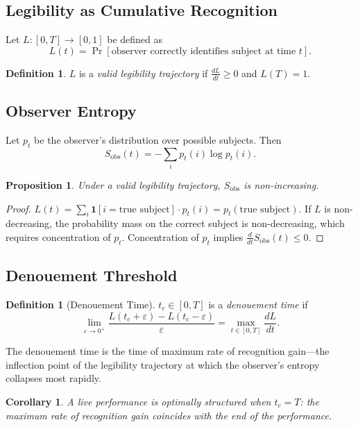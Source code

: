 \documentclass[11pt, twoside]{article}
\theoremstyle{plain}
\newtheorem{proposition}[theorem]{Proposition}
\newtheorem{corollary}[theorem]{Corollary}
\theoremstyle{definition}
\newtheorem{definition}[theorem]{Definition}
\theoremstyle{remark}
\begin{document}
\subsection{Legibility as Cumulative Recognition}

Let $L : [0, T] \to [0, 1]$ be defined as
\[
L(t) = \Pr[\text{observer correctly identifies subject at time } t].
\]

\begin{definition}
$L$ is a \emph{valid legibility trajectory} if $\frac{dL}{dt} \geq 0$ and $L(T) = 1$.
\end{definition}

\subsection{Observer Entropy}

Let $p_t$ be the observer's distribution over possible subjects. Then
\[
S_{\text{obs}}(t) = -\sum_i p_t(i) \log p_t(i).
\]

\begin{proposition}
Under a valid legibility trajectory, $S_{\text{obs}}$ is non-increasing.
\end{proposition}

\begin{proof}
$L(t) = \sum_i \mathbf{1}[i = \text{true subject}] \cdot p_t(i) = p_t(\text{true subject})$. If $L$ is non-decreasing, the probability mass on the correct subject is non-decreasing, which requires concentration of $p_t$. Concentration of $p_t$ implies $\frac{d}{dt} S_{\text{obs}}(t) \leq 0$.
\end{proof}

\subsection{Denouement Threshold}

\begin{definition}[Denouement Time]
$t_c \in [0, T]$ is a \emph{denouement time} if
\[
\lim_{\varepsilon \to 0^+} \frac{L(t_c + \varepsilon) - L(t_c - \varepsilon)}{\varepsilon} = \max_{t \in [0,T]} \frac{dL}{dt}.
\]
\end{definition}

The denouement time is the time of maximum rate of recognition gain---the inflection point of the legibility trajectory at which the observer's entropy collapses most rapidly.

\begin{corollary}
A live performance is optimally structured when $t_c = T$: the maximum rate of recognition gain coincides with the end of the performance.
\end{corollary}
\end{document}

